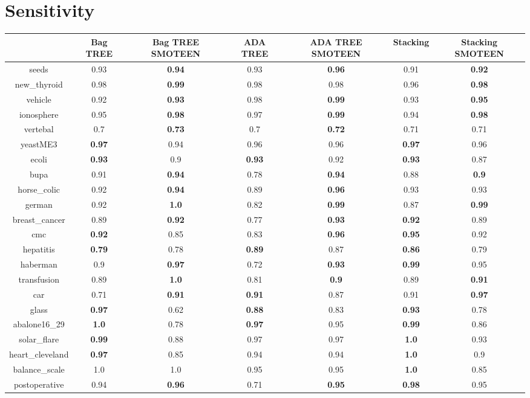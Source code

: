 \documentclass{article}%
\begin{document}
%
\section*{Sensitivity}%
\begin{tabular}{c|cccccc}%
&Bag TREE&Bag TREE SMOTEEN&ADA TREE&ADA TREE SMOTEEN&Stacking&Stacking SMOTEEN\\%
\hline%
seeds&0.93&\textbf{0.94}&0.93&\textbf{0.96}&0.91&\textbf{0.92}\\%
new\_thyroid&0.98&\textbf{0.99}&0.98&0.98&0.96&\textbf{0.98}\\%
vehicle&0.92&\textbf{0.93}&0.98&\textbf{0.99}&0.93&\textbf{0.95}\\%
ionosphere&0.95&\textbf{0.98}&0.97&\textbf{0.99}&0.94&\textbf{0.98}\\%
vertebal&0.7&\textbf{0.73}&0.7&\textbf{0.72}&0.71&0.71\\%
yeastME3&\textbf{0.97}&0.94&0.96&0.96&\textbf{0.97}&0.96\\%
ecoli&\textbf{0.93}&0.9&\textbf{0.93}&0.92&\textbf{0.93}&0.87\\%
bupa&0.91&\textbf{0.94}&0.78&\textbf{0.94}&0.88&\textbf{0.9}\\%
horse\_colic&0.92&\textbf{0.94}&0.89&\textbf{0.96}&0.93&0.93\\%
german&0.92&\textbf{1.0}&0.82&\textbf{0.99}&0.87&\textbf{0.99}\\%
breast\_cancer&0.89&\textbf{0.92}&0.77&\textbf{0.93}&\textbf{0.92}&0.89\\%
cmc&\textbf{0.92}&0.85&0.83&\textbf{0.96}&\textbf{0.95}&0.92\\%
hepatitis&\textbf{0.79}&0.78&\textbf{0.89}&0.87&\textbf{0.86}&0.79\\%
haberman&0.9&\textbf{0.97}&0.72&\textbf{0.93}&\textbf{0.99}&0.95\\%
transfusion&0.89&\textbf{1.0}&0.81&\textbf{0.9}&0.89&\textbf{0.91}\\%
car&0.71&\textbf{0.91}&\textbf{0.91}&0.87&0.91&\textbf{0.97}\\%
glass&\textbf{0.97}&0.62&\textbf{0.88}&0.83&\textbf{0.93}&0.78\\%
abalone16\_29&\textbf{1.0}&0.78&\textbf{0.97}&0.95&\textbf{0.99}&0.86\\%
solar\_flare&\textbf{0.99}&0.88&0.97&0.97&\textbf{1.0}&0.93\\%
heart\_cleveland&\textbf{0.97}&0.85&0.94&0.94&\textbf{1.0}&0.9\\%
balance\_scale&1.0&1.0&0.95&0.95&\textbf{1.0}&0.85\\%
postoperative&0.94&\textbf{0.96}&0.71&\textbf{0.95}&\textbf{0.98}&0.95\\%
\end{tabular}
\end{document}
